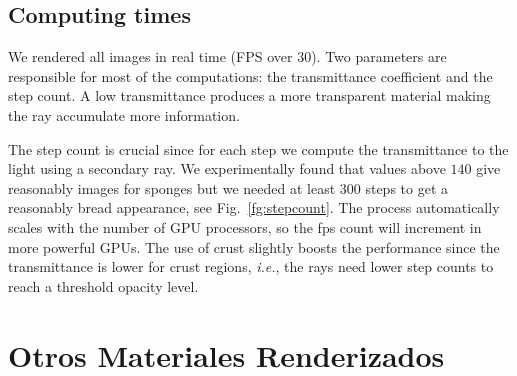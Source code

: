 \subsection*{Computing times}

We rendered all images in real time (FPS over 30). Two parameters are responsible for most of the computations: the transmittance coefficient and the step count.
A low transmittance produces a more transparent material making the ray accumulate more information.

The step count is crucial since for each step we compute the transmittance to the light using a secondary ray.
We experimentally found that values above $140$ give reasonably images for sponges but we needed at least $300$ steps to get a reasonably bread appearance, see Fig.~\ref{fg:stepcount}.
The process automatically scales with the number of GPU processors, so the fps count will increment in more powerful GPUs. 
The use of crust slightly boosts the performance since the transmittance is lower for crust regions, {\em i.e.}, the rays need lower step counts to reach a threshold opacity level.


\section{Otros Materiales Renderizados}





